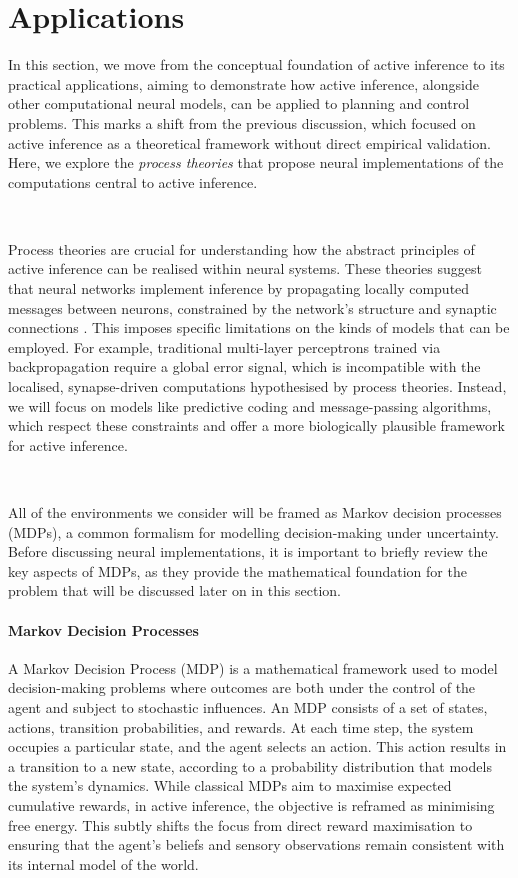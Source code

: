 \documentclass{article}
\begin{document}
\section{Applications} 

In this section, we move from the conceptual foundation of active inference to its practical applications, aiming to demonstrate how active inference, alongside other computational neural models, can be applied to planning and control problems. This marks a shift from the previous discussion, which focused on active inference as a theoretical framework without direct empirical validation. Here, we explore the \textit{process theories} that propose neural implementations of the computations central to active inference.

\

Process theories are crucial for understanding how the abstract principles of active inference can be realised within neural systems. These theories suggest that neural networks implement inference by propagating locally computed messages between neurons, constrained by the network's structure and synaptic connections \citep{parr2019neuronal}. This imposes specific limitations on the kinds of models that can be employed. For example, traditional multi-layer perceptrons trained via backpropagation require a global error signal, which is incompatible with the localised, synapse-driven computations hypothesised by process theories. Instead, we will focus on models like predictive coding and message-passing algorithms, which respect these constraints and offer a more biologically plausible framework for active inference.

\

All of the environments we consider will be framed as Markov decision processes (MDPs), a common formalism for modelling decision-making under uncertainty. Before discussing neural implementations, it is important to briefly review the key aspects of MDPs, as they provide the mathematical foundation for the problem that will be discussed later on in this section.

\paragraph{Markov Decision Processes}

A Markov Decision Process (MDP) is a mathematical framework used to model decision-making problems where outcomes are both under the control of the agent and subject to stochastic influences. An MDP consists of a set of states, actions, transition probabilities, and rewards. At each time step, the system occupies a particular state, and the agent selects an action. This action results in a transition to a new state, according to a probability distribution that models the system’s dynamics. While classical MDPs aim to maximise expected cumulative rewards, in active inference, the objective is reframed as minimising free energy. This subtly shifts the focus from direct reward maximisation to ensuring that the agent’s beliefs and sensory observations remain consistent with its internal model of the world.
\end{document}
